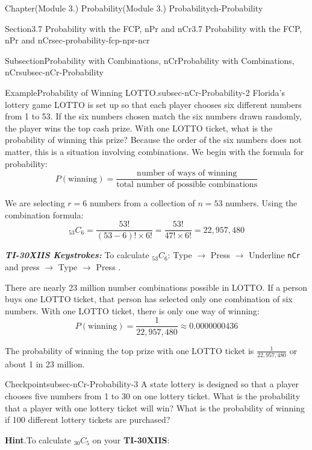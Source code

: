 \documentclass[oneside,10pt,]{book}
\newcommand{\blocktitlefont}{\relax}
\newcommand{\mono}[1]{\texttt{#1}}
\newcommand{\alert}[1]{\textbf{\textit{#1}}}
\newcommand{\terminology}[1]{\textbf{#1}}
\newcommand{\kbd}[1]{\keys{{#1}}}
\begin{document}
\begin{chapterptx}{Chapter}{(Module 3.) Probability}{}{(Module 3.) Probability}{}{}{ch-Probability}
\begin{sectionptx}{Section}{3.7 Probability with the FCP, nPr and nCr}{}{3.7 Probability with the FCP, nPr and nCr}{}{}{sec-probability-fcp-npr-ncr}
\begin{subsectionptx}{Subsection}{Probability with Combinations, nCr}{}{Probability with Combinations, nCr}{}{}{subsec-nCr-Probability}
\begin{example}{Example}{Probability of Winning LOTTO.}{subsec-nCr-Probability-2}
Florida's lottery game LOTTO is set up so that each player chooses six different numbers from 1 to 53. If the six numbers chosen match the six numbers drawn randomly, the player wins the top cash prize. With one LOTTO ticket, what is the probability of winning this prize?%
\noindent\hypertarget{subsec-nCr-Probability-2-3}{}Because the order of the six numbers does not matter, this is a situation involving combinations. We begin with the formula for probability:%
\begin{equation*}
P(\text{winning}) = \frac{\text{number of ways of winning}}{\text{total number of possible combinations}}
\end{equation*}
%
\par
We are selecting \(r = 6\) numbers from a collection of \(n = 53\) numbers. Using the combination formula:%
\begin{equation*}
{}_{53}C_6 = \frac{53!}{(53 - 6)! \times 6!} = \frac{53!}{47! \times 6!} = 22{,}957{,}480
\end{equation*}
%
\par
\alert{TI-30XIIS Keystrokes:} To calculate \({}_{53}C_6\): Type \kbd{53} \(\rightarrow\) Press \kbd{PRB} \(\rightarrow\) Underline \mono{nCr} and press \kbd{ENTER} \(\rightarrow\) Type \kbd{6} \(\rightarrow\) Press \kbd{ENTER}.%
\par
There are nearly 23 million number combinations possible in LOTTO. If a person buys one LOTTO ticket, that person has selected only one combination of six numbers. With one LOTTO ticket, there is only one way of winning:%
\begin{equation*}
P(\text{winning}) = \frac{1}{22{,}957{,}480} \approx 0.0000000436
\end{equation*}
%
\par
The probability of winning the top prize with one LOTTO ticket is \(\frac{1}{22{,}957{,}480}\) or about 1 in 23 million.%
\end{example}
\begin{inlineexercise}{Checkpoint}{}{subsec-nCr-Probability-3}%
A state lottery is designed so that a player chooses five numbers from 1 to 30 on one lottery ticket. What is the probability that a player with one lottery ticket will win? What is the probability of winning if 100 different lottery tickets are purchased?%
\par\smallskip%
\noindent\textbf{\blocktitlefont Hint}.\hypertarget{subsec-nCr-Probability-3-3}{}\quad{}To calculate \({}_{30}C_{5}\) on your \terminology{TI-30XIIS}:%
\begin{enumerate}

\end{enumerate}
\end{inlineexercise}
\end{subsectionptx}
\end{sectionptx}
\end{chapterptx}
\end{document}
